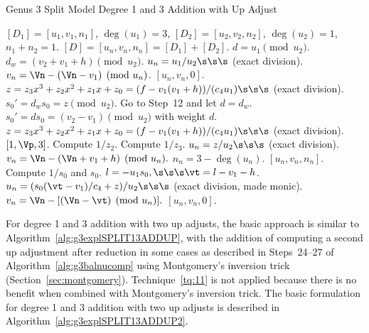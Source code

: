 \begin{algorithm}[H]
\caption{Genus 3 Split Model Degree 1 and 3 Addition with Up Adjust\label{alg:g3explSPLIT13ADDUP}}
\begin{algorithmic} [1]
\Require $[D_1] = [u_1,v_1,n_1]$, $\deg(u_1) = 3$, $[D_2] = [u_2,v_2,n_2]$, $\deg(u_2) = 1$, $n_1 + n_2 = 1$.
\Ensure $[D] = [u_n,v_n,n_n] = [D_1] + [D_2] $.
\algrule
\vspace{-2pt}
\State $d = u_1 \pmod{u_2}$.
    \State $d_w = (v_2 + v_1 + h) \pmod{u_2}$.
        \State $u_n = u_1/u_2 \s\s\s$ (exact division).
        \State $v_n = \Vn - (\Vn - v_1) \pmod{u_n}$.
        \State \Return $[u_n,v_n,0]$.
    \EndIf
    \State $z = z_3x^3 + z_2x^2 + z_1x + z_0 = (f - v_1(v_1 + h))/(c_4u_1) \s\s\s$ (exact division).  
    \State $s_0' = d_ws_0 = z \pmod{u_2}$.
    \State Go to Step~12 and let $d = d_w$.
\EndIf
\State $s_0' = ds_0 = (v_2 - v_1) \pmod{u_2}$ with weight $d$.
\State $z = z_3x^3 + z_2x^2 + z_1x + z_0 = (f - v_1(v_1 + h))/(c_4u_1) \s\s\s$ (exact division).  
         \Return $[1,\Vp,3]$.
        \Else \hspace{3pt} Compute $1/z_2$.
        \EndIf
    \Else \hspace{3pt} Compute $1/z_3$.
    \EndIf
    \State $u_n = z/u_2 \s\s\s$ (exact division).
    \State $v_n = \Vn - (\Vn + v_1 + h) \pmod{u_n}.$
    \State $n_n = 3 - \deg(u_n)$.
    \State \Return $[u_n,v_n,n_n]$.
\EndIf
\State Compute $1/s_0$ and $s_0$.
\State $l = -u_1s_0, \s\s\s \vt = l - v_1 - h$.
\State $u_n = (s_0(\vt - v_1)/c_4 + z)/u_2 \s\s\s$ (exact division, made monic).
\State $v_n = \Vn - [(\Vn - \vt) \pmod{u_n}].$ 
\State \Return $[u_n,v_n,0]$.
\vspace{-2pt}
\end{algorithmic}
\end{algorithm}



For degree 1 and 3 addition with two up adjusts, the basic approach is similar
to Algorithm~\ref{alg:g3explSPLIT13ADDUP}, with the addition of computing a
second up adjustment after reduction in some cases as described in Steps~24--27
of Algorithm~\ref{alg:g3balnucomp} using Montgomery's inversion trick
(Section~\ref{sec:montgomery}). Technique~\ref{tq:11} is not applied because
there is no benefit when combined with Montgomery's inversion trick. The basic
formulation for degree 1 and 3 addition with two up adjusts is described in
Algorithm~\ref{alg:g3explSPLIT13ADDUP2}.

